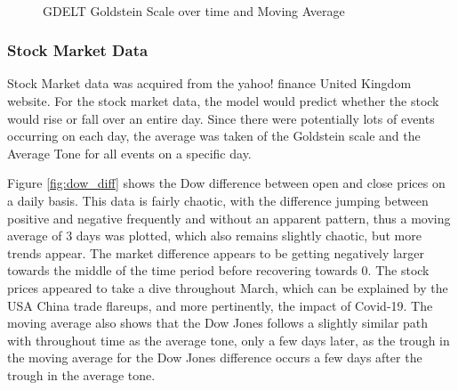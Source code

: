  \begin{figure}[H]
 	\centering
 	\\
 	\caption{GDELT Goldstein Scale over time and Moving Average}
 	\label{fig:gs_diff}
 \end{figure}
 
 
\subsubsection{Stock Market Data}
Stock Market data was acquired from the yahoo! finance United Kingdom website. For the stock market data, the model would predict whether the stock would rise or fall over an entire day. Since there were potentially lots of events occurring on each day, the average was taken of the Goldstein scale and the Average Tone for all events on a specific day. 

Figure \ref{fig:dow_diff} shows the Dow difference between open and close prices on a daily basis. This data is fairly chaotic, with the difference jumping between positive and negative frequently and without an apparent pattern, thus a moving average of 3 days was plotted, which also remains slightly chaotic, but more trends appear. The market difference appears to be getting negatively larger towards the middle of the time period before recovering towards 0. The stock prices appeared to take a dive throughout March, which can be explained by the USA China trade flareups, and more pertinently, the impact of Covid-19.  The moving average also shows that the Dow Jones follows a slightly similar path with throughout time as the average tone, only a few days later, as the trough in the moving average for the Dow Jones difference occurs a few days after the trough in the average tone.

